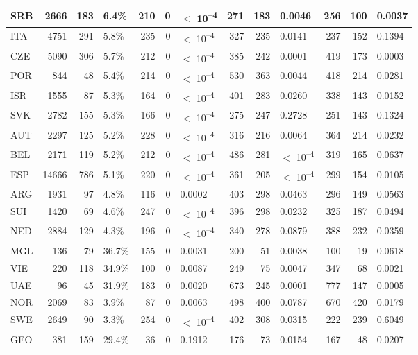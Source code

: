 \begin{tabular}{l|r|r|l|r|r|l|r|r|l|r|r|l}
\hline
SRB & 2666 & 183 & 6.4\% & 210 & 0 & $<$ 10\textsuperscript{--4} & 271 & 183 & 0.0046 & 256 & 100 & 0.0037\\
\hline
ITA & 4751 & 291 & 5.8\% & 235 & 0 & $<$ 10\textsuperscript{--4} & 327 & 235 & 0.0141 & 237 & 152 & 0.1394\\
\hline
CZE & 5090 & 306 & 5.7\% & 212 & 0 & $<$ 10\textsuperscript{--4} & 385 & 242 & 0.0001 & 419 & 173 & 0.0003\\
\hline
POR & 844 & 48 & 5.4\% & 214 & 0 & $<$ 10\textsuperscript{--4} & 530 & 363 & 0.0044 & 418 & 214 & 0.0281\\
\hline
ISR & 1555 & 87 & 5.3\% & 164 & 0 & $<$ 10\textsuperscript{--4} & 401 & 283 & 0.0260 & 338 & 143 & 0.0152\\
\hline
SVK & 2782 & 155 & 5.3\% & 166 & 0 & $<$ 10\textsuperscript{--4} & 275 & 247 & 0.2728 & 251 & 143 & 0.1324\\
\hline
AUT & 2297 & 125 & 5.2\% & 228 & 0 & $<$ 10\textsuperscript{--4} & 316 & 216 & 0.0064 & 364 & 214 & 0.0232\\
\hline
BEL & 2171 & 119 & 5.2\% & 212 & 0 & $<$ 10\textsuperscript{--4} & 486 & 281 & $<$ 10\textsuperscript{--4} & 319 & 165 & 0.0637\\
\hline
ESP & 14666 & 786 & 5.1\% & 220 & 0 & $<$ 10\textsuperscript{--4} & 361 & 205 & $<$ 10\textsuperscript{--4} & 299 & 154 & 0.0105\\
\hline
ARG & 1931 & 97 & 4.8\% & 116 & 0 & 0.0002 & 403 & 298 & 0.0463 & 296 & 149 & 0.0563\\
\hline
SUI & 1420 & 69 & 4.6\% & 247 & 0 & $<$ 10\textsuperscript{--4} & 396 & 298 & 0.0232 & 325 & 187 & 0.0494\\
\hline
NED & 2884 & 129 & 4.3\% & 196 & 0 & $<$ 10\textsuperscript{--4} & 340 & 278 & 0.0879 & 388 & 232 & 0.0359\\
\hline
MGL & 136 & 79 & 36.7\% & 155 & 0 & 0.0031 & 200 & 51 & 0.0038 & 100 & 19 & 0.0618\\
\hline
VIE & 220 & 118 & 34.9\% & 100 & 0 & 0.0087 & 249 & 75 & 0.0047 & 347 & 68 & 0.0021\\
\hline
UAE & 96 & 45 & 31.9\% & 183 & 0 & 0.0020 & 673 & 245 & 0.0001 & 777 & 147 & 0.0005\\
\hline
NOR & 2069 & 83 & 3.9\% & 87 & 0 & 0.0063 & 498 & 400 & 0.0787 & 670 & 420 & 0.0179\\
\hline
SWE & 2649 & 90 & 3.3\% & 254 & 0 & $<$ 10\textsuperscript{--4} & 402 & 308 & 0.0315 & 222 & 239 & 0.6049\\
\hline
GEO & 381 & 159 & 29.4\% & 36 & 0 & 0.1912 & 176 & 73 & 0.0154 & 167 & 48 & 0.0207\\

\end{tabular}
